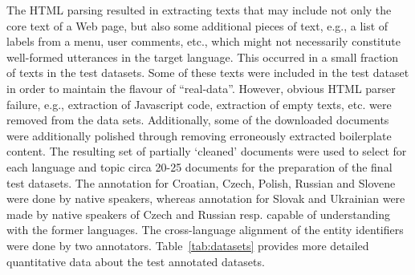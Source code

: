 \documentclass[11pt]{article}
\begin{document}
The HTML parsing resulted in extracting texts that may include not only
the core text of a Web page, but also some additional pieces of text,
e.g., a list of labels from a menu, user comments, etc., which might not
necessarily constitute well-formed utterances in the target language.
This occurred in a small fraction of texts in the test datasets.  Some of
these texts were included in the test dataset in order to maintain the
flavour of “real-data”.  However, obvious HTML parser failure, e.g.,
extraction of Javascript code, extraction of empty texts, etc. were removed
from the data sets.  Additionally, some of the downloaded documents were
additionally polished through removing erroneously extracted boilerplate
content. The resulting set of partially `cleaned' documents were used to
select for each language and topic circa 20-25 documents for the
preparation of the final test datasets. The annotation for Croatian,
Czech, Polish, Russian and Slovene were done by native speakers, whereas
annotation for Slovak and Ukrainian were made by native speakers of Czech
and Russian resp.  capable of understanding with the former
languages. The cross-language alignment of the entity identifiers were
done by two annotators.  Table~\ref{tab:datasets} provides more detailed
quantitative data about the test annotated datasets.

\end{document}
